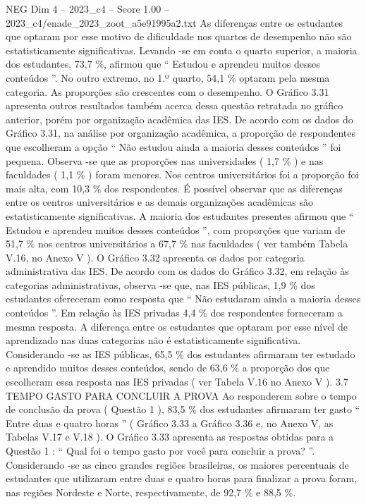 \begin{textsample}{NEG Dim 4 – 2023\_c4 – Score 1.00 – 2023\_c4/enade\_2023\_zoot\_a5e91995a2.txt}
As diferenças entre os estudantes que optaram por esse motivo de dificuldade nos quartos de desempenho não são estatisticamente significativas.
Levando -se em conta o quarto superior, a maioria dos estudantes, 73,7 \%, afirmou que “ Estudou e aprendeu muitos desses conteúdos ”.
No outro extremo, no 1.º quarto, 54,1 \% optaram pela mesma categoria.
As proporções são crescentes com o desempenho.
O Gráfico 3.31 apresenta outros resultados também acerca dessa questão retratada no gráfico anterior, porém por organização acadêmica das IES.
De acordo com os dados do Gráfico 3.31, na análise por organização acadêmica, a proporção de respondentes que escolheram a opção “ Não estudou ainda a maioria desses conteúdos ” foi pequena.
Observa -se que as proporções nas universidades ( 1,7 \% ) e nas faculdades ( 1,1 \% ) foram menores.
Nos centros universitários foi a proporção foi mais alta, com 10,3 \% dos respondentes.
É possível observar que as diferenças entre os centros universitários e as demais organizações acadêmicas são estatisticamente significativas.
A maioria dos estudantes presentes afirmou que “ Estudou e aprendeu muitos desses conteúdos ”, com proporções que variam de 51,7 \% nos centros universitários a 67,7 \% nas faculdades ( ver também Tabela V.16, no Anexo V ).
O Gráfico 3.32 apresenta os dados por categoria administrativa das IES.
De acordo com os dados do Gráfico 3.32, em relação às categorias administrativas, observa -se que, nas IES públicas, 1,9 \% dos estudantes ofereceram como resposta que “ Não estudaram ainda a maioria desses conteúdos ”.
Em relação às IES privadas 4,4 \% dos respondentes forneceram a mesma resposta.
A diferença entre os estudantes que optaram por esse nível de aprendizado nas duas categorias não é estatisticamente significativa.
Considerando -se as IES públicas, 65,5 \% dos estudantes afirmaram ter estudado e aprendido muitos desses conteúdos, sendo de 63,6 \% a proporção dos que escolheram essa resposta nas IES privadas ( ver Tabela V.16 no Anexo V ). 3.7 TEMPO GASTO PARA CONCLUIR A PROVA Ao responderem sobre o tempo de conclusão da prova ( Questão 1 ), 83,5 \% dos estudantes afirmaram ter gasto “ Entre duas e quatro horas ” ( Gráfico 3.33 a Gráfico 3.36 e, no Anexo V, as Tabelas V.17 e V.18 ).
O Gráfico 3.33 apresenta as respostas obtidas para a Questão 1 : “ Qual foi o tempo gasto por você para concluir a prova? ”.
Considerando -se as cinco grandes regiões brasileiras, os maiores percentuais de estudantes que utilizaram entre duas e quatro horas para finalizar a prova foram, nas regiões Nordeste e Norte, respectivamente, de 92,7 \% e 88,5 \%.

\end{textsample}

